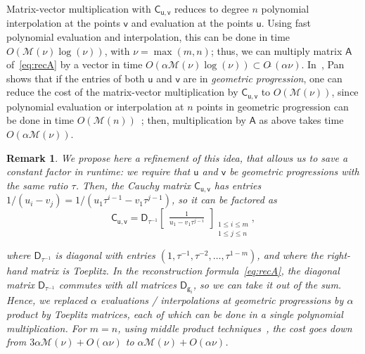 \documentclass[sigconf]{acmart}
\newcommand{\vg}{\ensuremath{\mathsf{g}}}
\newcommand{\vu}{\ensuremath{\mathsf{u}}}
\newcommand{\vv}{\ensuremath{\mathsf{v}}}
\newcommand{\mA}{\ensuremath{\mathsf{A}}}
\newcommand{\mC}{\ensuremath{\mathsf{C}}}
\newcommand{\mD}{\ensuremath{\mathsf{D}}}
\newcommand{\M}{\ensuremath{\mathscr{M}}}
\newcommand{\mx}{\ensuremath{\nu}}
\newcommand{\Otilde}[1]{\ensuremath{O\tilde{~}(#1)}} %
\theoremstyle{acmdefinition}
\newtheorem{remark}[theorem]{Remark}
\begin{document}
Matrix-vector multiplication with $\mC_{\vu,\vv}$ reduces to degree
$n$ polynomial interpolation at the points $\vv$ and evaluation at the
points $\vu$. Using fast polynomial evaluation and interpolation, this
can be done in time $O(\M(\mx)\log(\mx))$, with $\mx=\max(m,n)$; thus, we
can multiply matrix $\mA$ of~\eqref{eq:recA} by a vector in time
$O(\alpha \M(\mx)\log(\mx))\subset \Otilde{\alpha \mx}$.
In~\cite[Theorem~4.7.3]{Pan01}, Pan shows that if the entries of both
$\vu$ and $\vv$ are in {\em geometric progression}, one can reduce the
cost of the matrix-vector multiplication by $\mC_{\vu,\vv}$ to
$O(\M(\mx))$, since polynomial evaluation or interpolation at $n$
points in geometric progression can be done in time $O(\M(n))$~\cite{Bluestein70,BoSc05};
then, multiplication by $\mA$ as above takes time
$O(\alpha\M(\mx))$.

\vspace{-2mm}

\begin{remark}\label{rmk:factor3}
We propose here a refinement of this idea, that allows us to
save a constant factor in runtime: we require that $\vu$ and $\vv$ be
geometric progressions with {\em the same ratio} $\tau$. Then, the
Cauchy matrix $\mC_{\vu,\vv}$ has entries $1/(u_i -
v_j) = 1/(u_1 \tau^{i-1} - v_1 \tau^{j-1})$, so it can be factored as
\vspace{-3px}
$$
\mC_{\vu,\vv}=\mD_{\tau^{-1}}
\begin{bmatrix}
\frac{1}{u_1 - v_1 \tau^{j-i}}
\end{bmatrix}_{\substack{1 \leq i \leq m\\1 \leq j \leq n}},
$$

\vspace{-3px}
\noindent where $\mD_{\tau^{-1}}$ is diagonal with entries
$(1,\tau^{-1},\tau^{-2},\dots,\tau^{1-m})$, and where the right-hand
matrix is Toeplitz. In the reconstruction formula~\eqref{eq:recA}, the
diagonal matrix $\mD_{\tau^{-1}}$ commutes with all matrices
$\mD_{\vg_i}$, so we can take it out of the sum. Hence, we replaced
$\alpha$ evaluations / interpolations at geometric progressions by
$\alpha$ product by Toeplitz matrices, each of which can be done in a
single polynomial multiplication.
%
%
For $m=n$, using middle product techniques~\cite{HaQuZi04,BoLeSc03},
the cost goes down from $3\alpha \M(\mx) +O(\alpha \mx)$ to
$\alpha \M(\mx) +O(\alpha \mx)$.
\end{remark}
\end{document}
